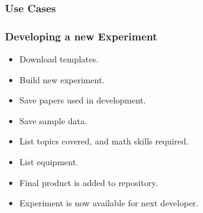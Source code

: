 \documentclass{beamer} %
\begin{document}
\begin{frame}
\frametitle{Use Cases}
\href{https://pjl.ucalgary.ca}{}
\end{frame}

\begin{frame}
\frametitle{Developing a new Experiment}
    \begin{itemize}
    		\item Download templates.
    		\item Build new experiment.
    		\item Save papers used in development.
    		\item Save sample data.
    		\item List topics covered, and math skills required.
    		\item List equipment.
    		\item Final product is added to repository.
    		\item Experiment is now available for next developer.
    \end{itemize}
  \end{frame}
\end{document}
